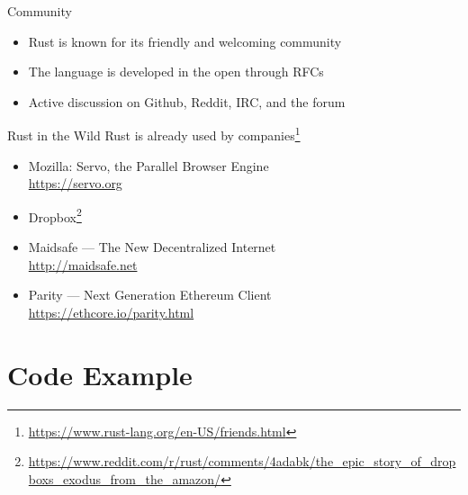 \documentclass[aspectratio=1610,t]{beamer}
\begin{document}
\begin{frame}[c]{Community}
  \begin{itemize}
    \item Rust is known for its friendly and welcoming community
    \item The language is developed in the open through RFCs
    \item Active discussion on Github, Reddit, IRC, and the forum
  \end{itemize}
\end{frame}

\begin{frame}[c]{Rust in the Wild}
  Rust is already used by companies\footnote{\url{https://www.rust-lang.org/en-US/friends.html}}
  \begin{itemize}
    \item Mozilla: Servo, the Parallel Browser Engine\\
      {\footnotesize\url{https://servo.org}}
    \item Dropbox\footnote{\url{https://www.reddit.com/r/rust/comments/4adabk/the_epic_story_of_dropboxs_exodus_from_the_amazon/}}
    \item Maidsafe --- The New Decentralized Internet\\
      {\footnotesize\url{http://maidsafe.net}}
    \item Parity --- Next Generation Ethereum Client\\
      {\footnotesize\url{https://ethcore.io/parity.html}}
  \end{itemize}
\end{frame}


\section{Code Example}
\end{document}
